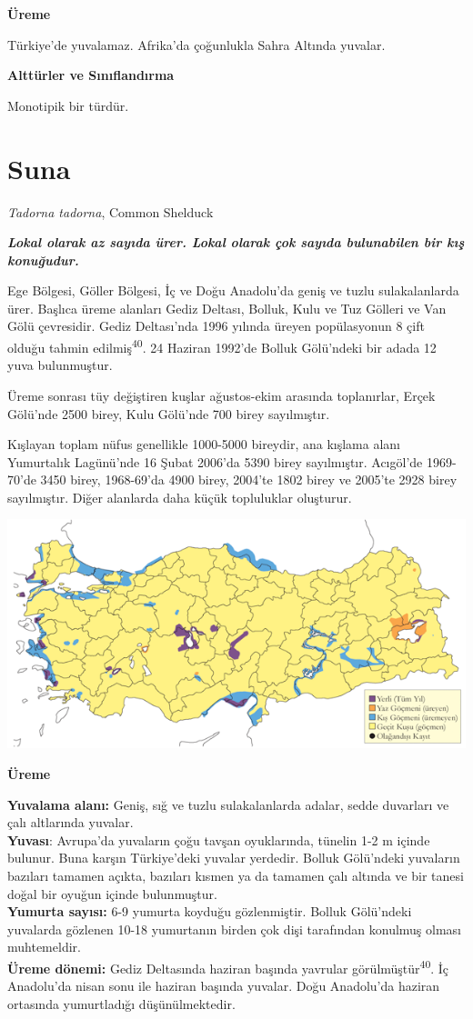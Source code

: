 \documentclass[
  letterpaper,
  DIV=11,
  numbers=noendperiod]{scrreprt}
\begin{document}
\textbf{Üreme}

Türkiye'de yuvalamaz. Afrika'da çoğunlukla Sahra Altında yuvalar.

\textbf{Alttürler ve Sınıflandırma}

Monotipik bir türdür.

\section{Suna}\label{suna}

\emph{Tadorna tadorna}, Common Shelduck

\textbf{\emph{Lokal olarak az sayıda ürer. Lokal olarak çok sayıda
bulunabilen bir kış konuğudur.}}

Ege Bölgesi, Göller Bölgesi, İç ve Doğu Anadolu'da geniş ve tuzlu
sulakalanlarda ürer. Başlıca üreme alanları Gediz Deltası, Bolluk, Kulu
ve Tuz Gölleri ve Van Gölü çevresidir. Gediz Deltası'nda 1996 yılında
üreyen popülasyonun 8 çift olduğu tahmin edilmiş\textsuperscript{40}. 24
Haziran 1992'de Bolluk Gölü'ndeki bir adada 12 yuva bulunmuştur.

Üreme sonrası tüy değiştiren kuşlar ağustos-ekim arasında toplanırlar,
Erçek Gölü'nde 2500 birey, Kulu Gölü'nde 700 birey sayılmıştır.

Kışlayan toplam nüfus genellikle 1000-5000 bireydir, ana kışlama alanı
Yumurtalık Lagünü'nde 16 Şubat 2006'da 5390 birey sayılmıştır. Acıgöl'de
1969-70'de 3450 birey, 1968-69'da 4900 birey, 2004'te 1802 birey ve
2005'te 2928 birey sayılmıştır. Diğer alanlarda daha küçük topluluklar
oluşturur.

\includegraphics{images/harita_Page_012.png}

\textbf{Üreme}

\textbf{Yuvalama alanı:} Geniş, sığ ve tuzlu sulakalanlarda adalar,
sedde duvarları ve çalı altlarında yuvalar.\\
\textbf{Yuvası}: Avrupa'da yuvaların çoğu tavşan oyuklarında, tünelin
1-2 m içinde bulunur. Buna karşın Türkiye'deki yuvalar yerdedir. Bolluk
Gölü'ndeki yuvaların bazıları tamamen açıkta, bazıları kısmen ya da
tamamen çalı altında ve bir tanesi doğal bir oyuğun içinde
bulunmuştur.\\
\textbf{Yumurta sayısı:} 6-9 yumurta koyduğu gözlenmiştir. Bolluk
Gölü'ndeki yuvalarda gözlenen 10-18 yumurtanın birden çok dişi
tarafından konulmuş olması muhtemeldir.\\
\textbf{Üreme dönemi:} Gediz Deltasında haziran başında yavrular
görülmüştür\textsuperscript{40}. İç Anadolu'da nisan sonu ile haziran
başında yuvalar. Doğu Anadolu'da haziran ortasında yumurtladığı
düşünülmektedir.
\end{document}
